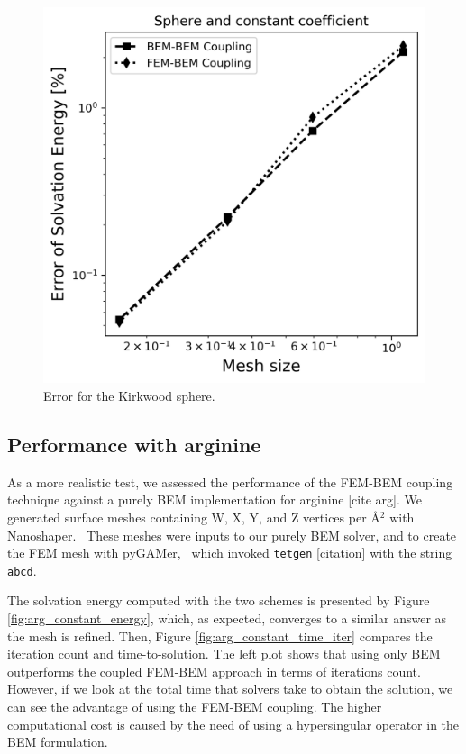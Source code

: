 \begin{figure}
  \centering
  \includegraphics[width=0.6\linewidth]{Sphere_const_coeff_error.png}
  \caption{Error for the Kirkwood sphere.}
  \label{fig:error_sphere}
\end{figure}

\subsection*{\sffamily \large Performance with arginine}

As a more realistic test, we assessed the performance of the FEM-BEM coupling technique against a purely BEM implementation for arginine [cite arg]. 
We generated surface meshes containing W, X, Y, and Z vertices per \AA$^2$ with Nanoshaper.~\cite{decherchi2013general}
These meshes were inputs to our purely BEM solver, and to create the FEM mesh with pyGAMer,~\cite{lee2020open} which invoked \texttt{tetgen} [citation] with the string \texttt{abcd}.

The solvation energy computed with the two schemes is presented by Figure \ref{fig:arg_constant_energy}, which, as expected, converges to a similar answer as the mesh is refined.
Then, Figure \ref{fig:arg_constant_time_iter} compares the iteration count and time-to-solution. The left plot shows that using only BEM outperforms the coupled FEM-BEM approach in terms of iterations count. However, if we look at the total time that solvers take to obtain the solution, we can see the advantage of using the FEM-BEM coupling. The higher computational cost is caused by the need of using a hypersingular operator in the BEM formulation.



